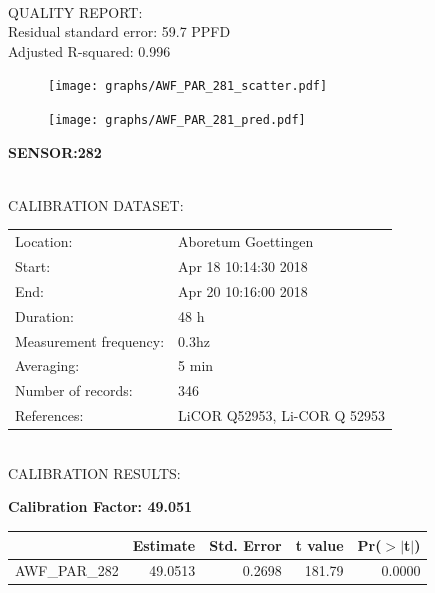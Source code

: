 \documentclass[oneside]{report}
\begin{document}
\hrulefill\\
QUALITY REPORT:\\
Residual standard error: 59.7 PPFD\\
Adjusted R-squared: 0.996



\begin{figure}[H]
  \centering
  \texttt{[image: graphs/AWF\_PAR\_281\_scatter.pdf]}
\end{figure}




\begin{figure}[H]
  \centering
  \texttt{[image: graphs/AWF\_PAR\_281\_pred.pdf]}
\end{figure}

\pagebreak


\begin{center}
\large{\textbf{SENSOR:282}}\\
\end{center}

\hrulefill\\
CALIBRATION DATASET:\\
\begin{table}[h!]
  \centering
  \label{tab:table1}
  \begin{tabular}{ll}
    Location: & Aboretum Goettingen\\ 
    
    
    Start:  & Apr 18 10:14:30 2018 \\
    End:   & Apr 20 10:16:00 2018\\ 
    Duration: & 48 h\\
    Measurement frequency: & 0.3hz\\
    Averaging:  &5 min\\
    Number of records: & 346 \\
    References: & LiCOR Q52953, Li-COR Q 52953 \\
  \end{tabular}
\end{table}

\hrulefill\\
CALIBRATION RESULTS:\\


\begin{center}
\textbf{\large{Calibration Factor: 49.051}}\\
\end{center}
\begin{table}[ht]
\centering
\begin{tabular}{rrrrr}
  \hline
 & Estimate & Std. Error & t value & Pr($>$$|$t$|$) \\ 
  \hline
AWF\_PAR\_282 & 49.0513 & 0.2698 & 181.79 & 0.0000 \\ 
   \hline
\end{tabular}
\end{table}
\end{document}
